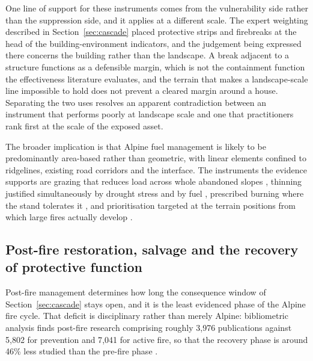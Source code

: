 \documentclass[11pt,a4paper]{article}
\begin{document}
One line of support for these instruments comes from the vulnerability side rather than the suppression side, and it applies at a different scale. The expert weighting described in Section~\ref{sec:cascade} placed protective strips and firebreaks at the head of the building-environment indicators, and the judgement being expressed there concerns the building rather than the landscape. A break adjacent to a structure functions as a defensible margin, which is not the containment function the effectiveness literature evaluates, and the terrain that makes a landscape-scale line impossible to hold does not prevent a cleared margin around a house. Separating the two uses resolves an apparent contradiction between an instrument that performs poorly at landscape scale and one that practitioners rank first at the scale of the exposed asset.

The broader implication is that Alpine fuel management is likely to be predominantly area-based rather than geometric, with linear elements confined to ridgelines, existing road corridors and the interface. The instruments the evidence supports are grazing that reduces load across whole abandoned slopes \citep{rouetleduc_effects_2021}, thinning justified simultaneously by drought stress and by fuel \citep{giuggiola_droughtinduced_2010}, prescribed burning where the stand tolerates it \citep{gamba_prescribed_2025}, and prioritisation targeted at the terrain positions from which large fires actually develop \citep{conedera_linking_2024, krsnik_spatial_2024}.

\subsection{Post-fire restoration, salvage and the recovery of protective function}

Post-fire management determines how long the consequence window of Section~\ref{sec:cascade} stays open, and it is the least evidenced phase of the Alpine fire cycle. That deficit is disciplinary rather than merely Alpine: bibliometric analysis finds post-fire research comprising roughly 3{,}976 publications against 5{,}802 for prevention and 7{,}041 for active fire, so that the recovery phase is around 46\% less studied than the pre-fire phase \citep{goncalves_fostering_2025}.
\end{document}
